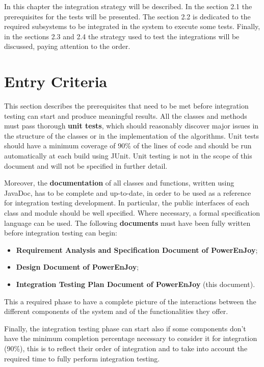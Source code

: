 In this chapter the integration strategy will be described. In the section 2.1
the prerequisites for the tests will be presented. The section 2.2 is dedicated to
the required subsystems to be integrated in the system to execute some tests.
Finally, in the sections 2.3 and 2.4 the strategy used to test the integrations will
be discussed, paying attention to the order.
\section{Entry Criteria}
This section describes the prerequisites that need to be met before integration
testing can start and produce meaningful results.
All the classes and methods must pass thorough \textbf{unit tests}, which should
reasonably discover major issues in the structure of the classes or in the implementation
of the algorithms. Unit tests should have a minimum coverage
of 90\% of the lines of code and should be run automatically at each build
using JUnit. Unit testing is not in the scope of this document and will not
be specified in further detail.

Moreover, the \textbf{documentation} of all classes and functions, written using
JavaDoc, has to be complete and up-to-date, in order to be used as a reference
for integration testing development. In particular, the public interfaces of
each class and module should be well specified. Where necessary, a formal
specification language can be used.
The following \textbf{documents} must have been fully written before integration testing can
begin:

\begin{itemize}
\item \textbf{Requirement Analysis and Specification Document of PowerEnJoy};
\item \textbf{Design Document of PowerEnJoy};
\item \textbf{Integration Testing Plan Document of PowerEnJoy} (this document).
\end{itemize}

This a required phase to have a complete picture of the interactions between the different components of the system and of the functionalities they offer.

Finally, the integration testing phase can start also if some components don't have the minimum completion percentage necessary to consider it for integration (90\%), this is to reflect their order of integration and to take into account the required time to fully perform integration testing.

